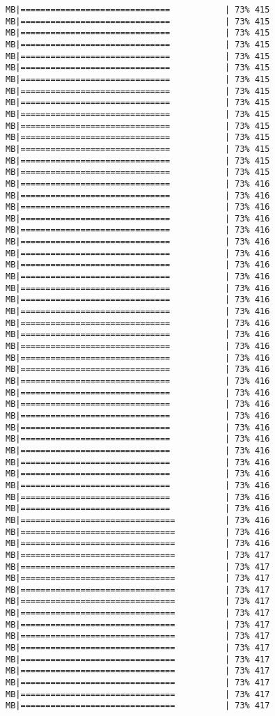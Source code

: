 \documentclass[
]{article}
\begin{document}
\begin{verbatim}
MB|==============================           | 73% 415 MB|==============================           | 73% 415 MB|==============================           | 73% 415 MB|==============================           | 73% 415 MB|==============================           | 73% 415 MB|==============================           | 73% 415 MB|==============================           | 73% 415 MB|==============================           | 73% 415 MB|==============================           | 73% 415 MB|==============================           | 73% 415 MB|==============================           | 73% 415 MB|==============================           | 73% 415 MB|==============================           | 73% 415 MB|==============================           | 73% 415 MB|==============================           | 73% 415 MB|==============================           | 73% 416 MB|==============================           | 73% 416 MB|==============================           | 73% 416 MB|==============================           | 73% 416 MB|==============================           | 73% 416 MB|==============================           | 73% 416 MB|==============================           | 73% 416 MB|==============================           | 73% 416 MB|==============================           | 73% 416 MB|==============================           | 73% 416 MB|==============================           | 73% 416 MB|==============================           | 73% 416 MB|==============================           | 73% 416 MB|==============================           | 73% 416 MB|==============================           | 73% 416 MB|==============================           | 73% 416 MB|==============================           | 73% 416 MB|==============================           | 73% 416 MB|==============================           | 73% 416 MB|==============================           | 73% 416 MB|==============================           | 73% 416 MB|==============================           | 73% 416 MB|==============================           | 73% 416 MB|==============================           | 73% 416 MB|==============================           | 73% 416 MB|==============================           | 73% 416 MB|==============================           | 73% 416 MB|==============================           | 73% 416 MB|==============================           | 73% 416 MB|===============================          | 73% 416 MB|===============================          | 73% 416 MB|===============================          | 73% 416 MB|===============================          | 73% 417 MB|===============================          | 73% 417 MB|===============================          | 73% 417 MB|===============================          | 73% 417 MB|===============================          | 73% 417 MB|===============================          | 73% 417 MB|===============================          | 73% 417 MB|===============================          | 73% 417 MB|===============================          | 73% 417 MB|===============================          | 73% 417 MB|===============================          | 73% 417 MB|===============================          | 73% 417 MB|===============================          | 73% 417 MB|===============================          | 73% 417 
\end{verbatim}
\end{document}
